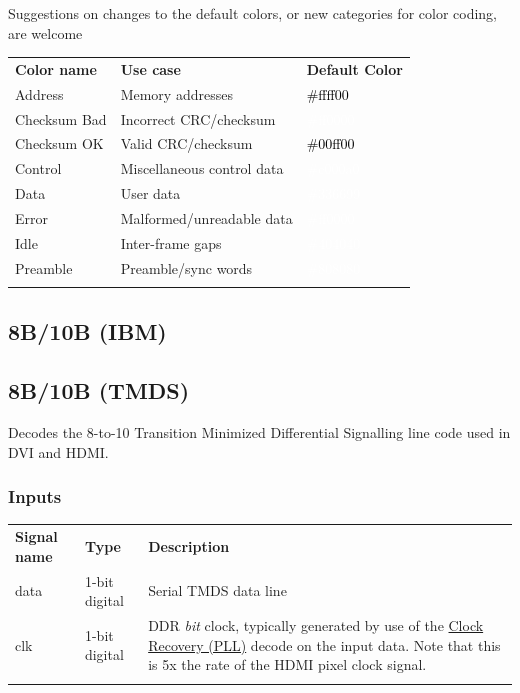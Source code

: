 \documentclass[11pt]{article}
\newcommand{\thickhline}{\Xhline{2.5\arrayrulewidth}}
\begin{document}
Suggestions on changes to the default colors, or new categories for color coding, are welcome

\begin{tabularx}{16cm}{llX}
\thickhline
\textbf{Color name} & \textbf{Use case} & \textbf{Default Color} \\
\thickhline
Address & Memory addresses & \cellcolor{address}\textcolor{black}{\#ffff00} \\
\thickhline
Checksum Bad & Incorrect CRC/checksum & \cellcolor{checksumbad}\textcolor{white}{\#ff0000} \\
\thickhline
Checksum OK & Valid CRC/checksum & \cellcolor{checksumok}\textcolor{black}{\#00ff00} \\
\thickhline
Control & Miscellaneous control data & \cellcolor{control}\textcolor{white}{\#c000a0} \\
\thickhline
Data & User data & \cellcolor{data}\textcolor{white}{\#336699} \\
\thickhline
Error & Malformed/unreadable data & \cellcolor{error}\textcolor{white}{\#ff0000} \\
\thickhline
Idle & Inter-frame gaps & \cellcolor{idle}\textcolor{white}{\#404040} \\
\thickhline
Preamble & Preamble/sync words & \cellcolor{preamble}\textcolor{white}{\#808080} \\
\thickhline
\end{tabularx}

\subsection{8B/10B (IBM)}

\subsection{8B/10B (TMDS)}

Decodes the 8-to-10 Transition Minimized Differential Signalling line code used in DVI and HDMI.

\subsubsection{Inputs}

\begin{tabularx}{16cm}{llX}
\thickhline
\textbf{Signal name} & \textbf{Type} & \textbf{Description} \\
\thickhline
data & 1-bit digital & Serial TMDS data line \\
\thickhline
clk & 1-bit digital & DDR \emph{bit} clock, typically generated by use of the \hyperref[filter:cdrpll]{Clock Recovery
(PLL)} decode on the input data. Note that this is 5x the rate of the HDMI pixel clock signal. \\
\thickhline
\end{tabularx}
\end{document}

